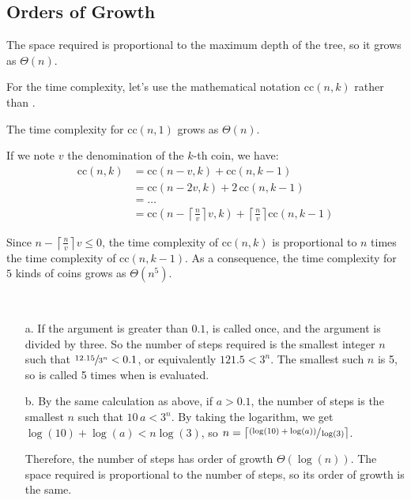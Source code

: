 \subsection{Orders of Growth}

\begin{exe}[1.14]
    The space required is proportional to the maximum depth of the tree, so it 
    grows as $\Theta(n)$.

    For the time complexity, let’s use the mathematical notation $\text{cc}(n, 
    k)$ rather than .

    The time complexity for $\text{cc}(n, 1)$ grows as $\Theta(n)$.

    If we note $v$ the denomination of the $k$-th coin, we have:
    \begin{align*}
        \text{cc}(n, k) &= \text{cc}(n - v, k) + \text{cc}(n, k - 1) \\
                        &= \text{cc}(n - 2v, k) + 2\, \text{cc}(n, k - 1) \\
                        &= … \\
                        &= \text{cc}(n - \left\lceil \frac{n}{v} \right\rceil v, 
                        k) + \left\lceil \frac{n}{v} \right\rceil \text{cc}(n, 
                        k - 1)
    \end{align*}

    Since $n - \left\lceil \frac{n}{v} \right\rceil v \leq 0$, the time 
    complexity of $\text{cc}(n, k)$ is proportional to $n$ times the time 
    complexity of $\text{cc}(n, k - 1)$. As a consequence, the time complexity 
    for $5$ kinds of coins grows as $\Theta(n^5)$.
\end{exe}

\begin{exe}[1.15]
    \ \vspace{-20pt}
    \begin{itemize}
        \item[a.] If the argument is greater than $0.1$,  is called 
            once, and the argument is divided by three. So the number of steps 
            required is the smallest integer $n$ such that $\sfrac{12.15}{3^n} 
            < 0.1$, or equivalently $121.5 < 3^n$. The smallest such $n$ is 5, 
            so  is called 5 times when  is evaluated.
        \item[b.] By the same calculation as above, if $a > 0.1$, the number of 
            steps is the smallest $n$ such that $10 \, a < 3^n$. By taking the 
            logarithm, we get $\log(10) + \log(a) < n \log(3)$, so $n 
            = \left\lceil \sfrac{(\log(10) + \log(a))}{\log(3)} \right\rceil$.

            Therefore, the number of steps has order of growth 
            $\Theta(\log(n))$. The space required is proportional to the number 
            of steps, so its order of growth is the same.
    \end{itemize}
\end{exe}

